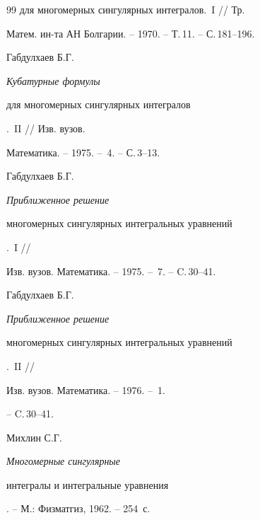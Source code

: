 \begin{thebibliography}{99}
{для многомерных сингулярных интегралов}.~I // Тр. 


Матем. ин-та АН Болгарии. -- 1970. -- Т.\,11. -- С.\,181--196.




Габдулхаев Б.Г. {\it Кубатурные формулы


для многомерных сингулярных интегралов}.~II // Изв. вузов.


Математика. -- 1975. -- \No\,4. -- С.\,3--13.




Габдулхаев Б.Г. {\it Приближенное решение


многомерных сингулярных интегральных уравнений}.~I //


Изв. вузов. Математика. -- 1975. -- \No\,7. -- C.\,30--41.




Габдулхаев Б.Г. {\it Приближенное решение


многомерных сингулярных интегральных уравнений}.~II //


Изв. вузов. Математика. -- 1976. -- \No\,1.


-- C.\,30--41.




Михлин С.Г. {\it Многомерные сингулярные


интегралы и интегральные уравнения}. -- М.: Физматгиз, 1962. -- 254~с.





\end{thebibliography}





\vskip 2cm












\label{end}









